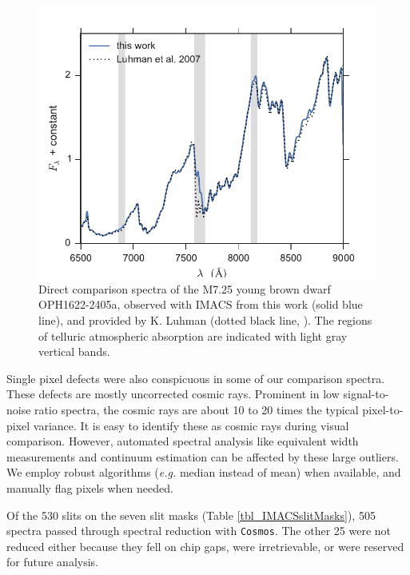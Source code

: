 \begin{figure}[ht!]
\caption[Comparison of IMACS spectroscopy to a previously published spectrum of the same source]{Direct comparison spectra of the M7.25 young brown dwarf OPH1622-2405a, observed with IMACS from this work (solid blue line), and provided by K. Luhman (dotted black line, \citet{2007ApJ...659.1629L}).  The regions of telluric atmospheric absorption are indicated with light gray vertical bands.  \label{fig_oph1622_compare}}
\centering
\includegraphics[scale=0.9]{chIMACS/figures/oph1622-2405a_compare}
\end{figure}

Single pixel defects were also conspicuous in some of our comparison spectra.  These defects are mostly uncorrected cosmic rays.  Prominent in low signal-to-noise ratio spectra, the cosmic rays are about 10 to 20 times the typical pixel-to-pixel variance.  It is easy to identify these as cosmic rays during visual comparison.  However, automated spectral analysis like equivalent width measurements and continuum estimation can be affected by these large outliers.  We employ robust algorithms (\emph{e.g.} median instead of mean) when available, and manually flag pixels when needed.

Of the 530 slits on the seven slit masks (Table \ref{tbl_IMACSslitMasks}), 505 spectra passed through spectral reduction with \texttt{Cosmos}.  The other 25 were not reduced either because they fell on chip gaps, were irretrievable, or were reserved for future analysis.

